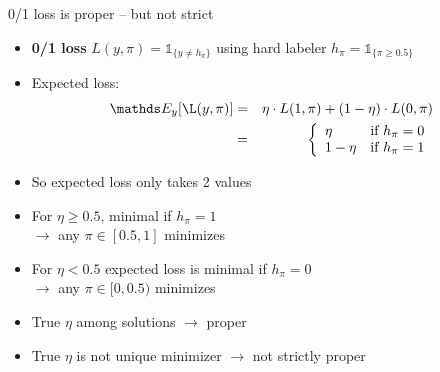 \documentclass[11pt,compress,t,notes=noshow, xcolor=table]{beamer}
\begin{document}
\begin{vbframe}{0/1 loss is proper -- but not strict}
\begin{itemize}
\item \textbf{0/1 loss} $L(y, \pi)=\mathds{1}_{\{y \neq h_\pi\}}$ using hard labeler  $h_{\pi}=\mathds{1}_{\{\pi\geq0.5\}}$ 
\item Expected loss:
\begin{eqnarray*}
\E_y[\L(y, \pi)] &=& \eta \cdot L(1,\pi) + (1-\eta) \cdot L(0,\pi)\\
&=& \left\{
\begin{array}{ll}
\eta & \text{if } h_{\pi} = 0 \\
1-\eta & \text{if } h_{\pi} = 1
\end{array}
\right.
\end{eqnarray*}

\item So expected loss only takes 2 values

\item For $\eta \geq 0.5$, minimal if $h_{\pi}=1$\\ $\rightarrow$ any $\pi \in [0.5,1]$ minimizes 

\item For $\eta < 0.5$ expected loss is minimal if $h_{\pi}=0$\\ $\rightarrow$ any $\pi \in [0, 0.5)$ minimizes 

\item True $\eta$ among solutions $\rightarrow$ proper
\item True $\eta$ is not unique minimizer $\rightarrow$ not strictly proper

\end{itemize}


\end{vbframe}
\end{document}
